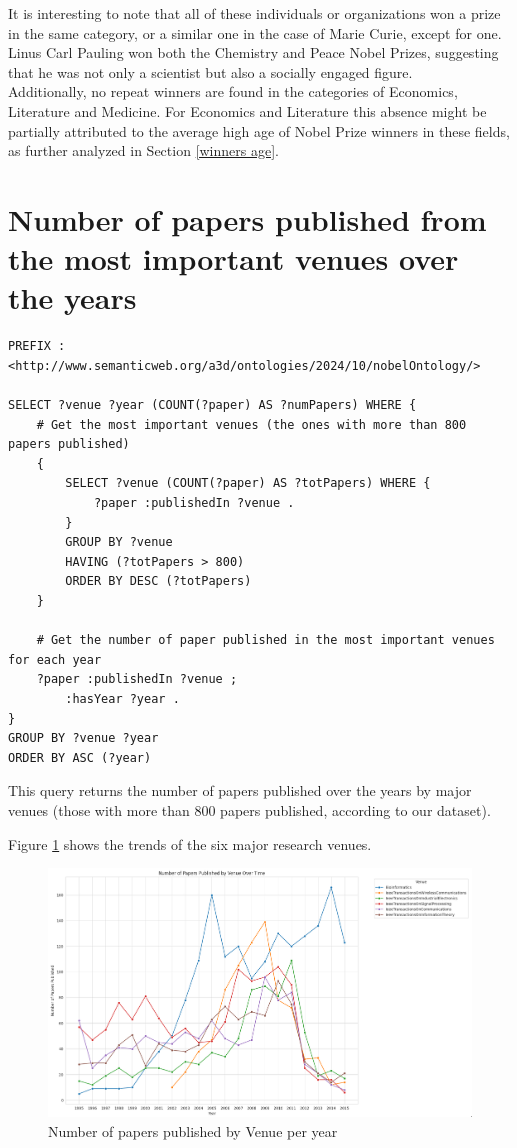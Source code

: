\documentclass{article}
\begin{document}
It is interesting to note that all of these individuals or organizations won a prize in the same category,
or a similar one in the case of Marie Curie, except for one. Linus Carl Pauling won both the Chemistry and Peace Nobel Prizes,
suggesting that he was not only a scientist but also a socially engaged figure.\\
Additionally, no repeat winners are found in the categories of Economics, Literature and Medicine.
For Economics and Literature this absence might be partially attributed to the average high age of Nobel Prize
winners in these fields, as further analyzed in Section \ref{winners age}.\\

\newpage

\section{Number of papers published from the most important venues over the years}

\begin{lstlisting}
PREFIX : <http://www.semanticweb.org/a3d/ontologies/2024/10/nobelOntology/>

SELECT ?venue ?year (COUNT(?paper) AS ?numPapers) WHERE {
    # Get the most important venues (the ones with more than 800 papers published)
    {
        SELECT ?venue (COUNT(?paper) AS ?totPapers) WHERE {
            ?paper :publishedIn ?venue .
        }
        GROUP BY ?venue
        HAVING (?totPapers > 800)
        ORDER BY DESC (?totPapers)
    }

    # Get the number of paper published in the most important venues for each year
    ?paper :publishedIn ?venue ;
        :hasYear ?year .
}
GROUP BY ?venue ?year
ORDER BY ASC (?year)
\end{lstlisting}

\vspace{1em}

This query returns the number of papers published over the years by major
venues (those with more than 800 papers published, according to our dataset).

Figure \ref{fig:papersPerVenue} shows the trends of the six major research venues.

\begin{figure}[H]
	\centering
	\label{fig:papersPerVenue}
	\includegraphics[width=\textwidth]{../queries/plots/papersPerVenue.png}
    \caption{Number of papers published by Venue per year}
\end{figure}
\end{document}
